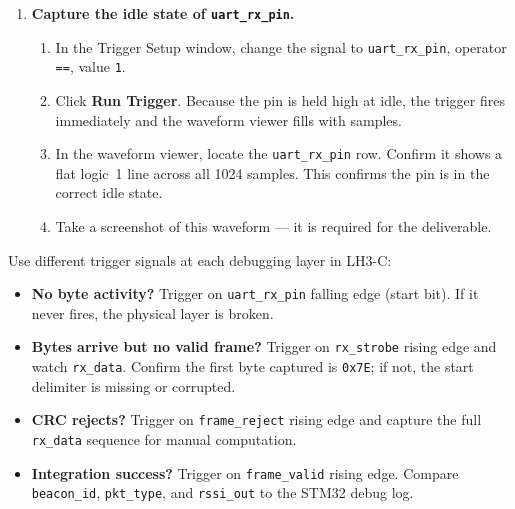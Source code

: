 \documentclass[11pt,letterpaper]{article}
\begin{document}
\begin{enumerate}[leftmargin=2em]
	\item \textbf{Capture the idle state of \texttt{uart\_rx\_pin}.}
	\begin{enumerate}[label=\alph*.]
		\item In the Trigger Setup window, change the signal to \texttt{uart\_rx\_pin}, operator \texttt{==}, value \texttt{1}.
		\item Click \textbf{Run Trigger}. Because the pin is held high at idle, the trigger fires immediately and the waveform viewer fills with samples.
		\item In the waveform viewer, locate the \texttt{uart\_rx\_pin} row. Confirm it shows a flat logic~1 line across all 1024 samples. This confirms the pin is in the correct \UART{} idle state.
		\item Take a screenshot of this waveform --- it is required for the deliverable.
	\end{enumerate}

\end{enumerate}

\begin{tcolorbox}[infobox={ILA Trigger Strategy for Integration Debugging}]
	Use different trigger signals at each debugging layer in LH3-C:
	\begin{itemize}[leftmargin=1.2em]
		\item \textbf{No byte activity?} Trigger on \texttt{uart\_rx\_pin} falling edge (start bit). If it never fires, the physical layer is broken.
		\item \textbf{Bytes arrive but no valid frame?} Trigger on \texttt{rx\_strobe} rising edge and watch \texttt{rx\_data}. Confirm the first byte captured is \texttt{0x7E}; if not, the start delimiter is missing or corrupted.
		\item \textbf{CRC rejects?} Trigger on \texttt{frame\_reject} rising edge and capture the full \texttt{rx\_data} sequence for manual \CRC{} computation.
		\item \textbf{Integration success?} Trigger on \texttt{frame\_valid} rising edge. Compare \texttt{beacon\_id}, \texttt{pkt\_type}, and \texttt{rssi\_out} to the STM32 debug log.
	\end{itemize}
\end{tcolorbox}

\newpage
\end{document}
